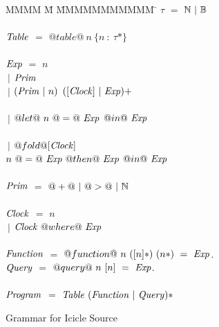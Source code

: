 
\begin{figure}

\begin{tabbing}
MMMM \= M \= MMMMMMMMMMM \= \kill
$\tau$          \> $=$  \> $\mathbb{N}~|~\mathbb{B}$ \\
\\
$\mathit{Table}$    \> $=$  \> $@table@~n~\{n~:~\tau*\}$ \\
\\
$\mathit{Exp}$
    \> $=$  \> $n$          \\
    \> $~|$ \> $\mathit{Prim}$     \\
    \> $~|$ \> $(\mathit{Prim}~|~n)$     \> $([\mathit{Clock}]~|~\mathit{Exp})+$ \\
\\
    \> $~|$ \> $@let@~n~@=@~\mathit{Exp}$
            \> $@in@~\mathit{Exp}$ \\
                \\
    \> $~|$ \> $@fold@[\mathit{Clock}]$ \\
    \>      \> $n~@=@~\mathit{Exp}~@then@~\mathit{Exp}$
            \> $@in@~\mathit{Exp}$ \\
\\
$\mathit{Prim}$
    \> $=$  \> $@+@~|~@>@~|~\mathbb{N}$ \\
\\
$\mathit{Clock}$
    \> $=$  \> $n$          \\
    \> $~|$ \> $\mathit{Clock}~@where@~\mathit{Exp}$          \\
\\
$\mathit{Function}$
    \> $=$  \> $@function@~n~([n]*)~(n*)~=~\mathit{Exp}$.          \\

$\mathit{Query}$
    \> $=$  \> $@query@~n~[n]~=~\mathit{Exp}$.          \\
\\
$\mathit{Program}$
    \> $=$  \> $\mathit{Table}~(\mathit{Function}~|~\mathit{Query})*$ \\
\end{tabbing}


\caption{Grammar for Icicle Source}
\label{fig:source:grammar}
\end{figure}

